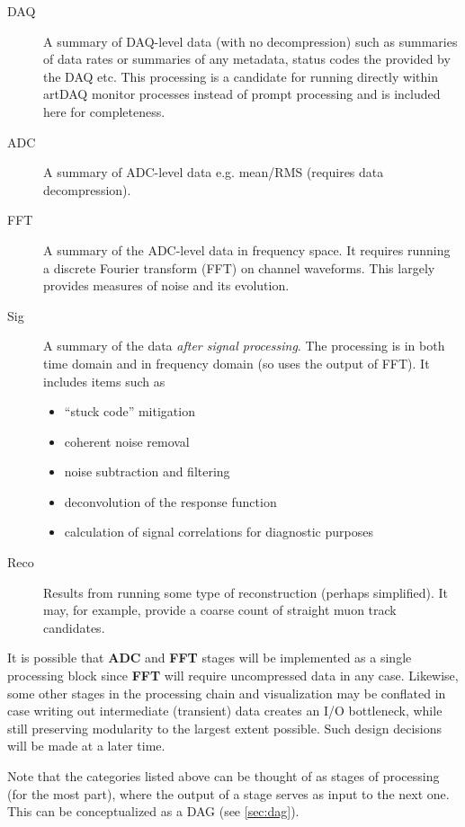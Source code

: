 \documentclass[pdftex,12pt,letter]{article}
\begin{document}
\begin{description}

\item[DAQ] A summary of DAQ-level data (with no decompression) such as summaries of data
 rates  or summaries of any metadata, status codes the provided by the DAQ etc.
This processing is a candidate for running directly within artDAQ monitor processes instead of prompt processing and is included here
for completeness.

\item[ADC] A summary of ADC-level data e.g. mean/RMS (requires data decompression).


\item[FFT] A summary of the ADC-level data in frequency space. It requires running a discrete Fourier
transform (FFT) on channel waveforms. This largely  provides measures of noise and its
evolution.

\item[Sig] A summary of the data \textit{after signal processing}.
The processing is in  both time domain and in frequency domain (so uses the output of FFT).
It includes items such as
\begin{itemize}
\item ``stuck code'' mitigation
\item coherent noise removal
\item noise subtraction and filtering
\item deconvolution of the response function
\item calculation of signal correlations for diagnostic purposes
\end{itemize}

\item[Reco] Results from running some type of reconstruction (perhaps simplified).
It may, for  example, provide a coarse count of straight muon track candidates.

\end{description}


\noindent It is possible that \textbf{ADC} and \textbf{FFT} stages will be implemented as a single processing
block since \textbf{FFT} will require uncompressed data in any case. Likewise, some other stages in the processing
chain and visualization may be conflated in case writing out intermediate (transient) data creates an I/O bottleneck,
while still preserving modularity to the largest extent possible. Such design decisions will be made at a later time.

Note that the categories listed above can be thought of as stages of processing (for the most part), where
the output of a stage serves as input to the next one. This can be conceptualized as a DAG (see \ref{sec:dag}).
\end{document}
